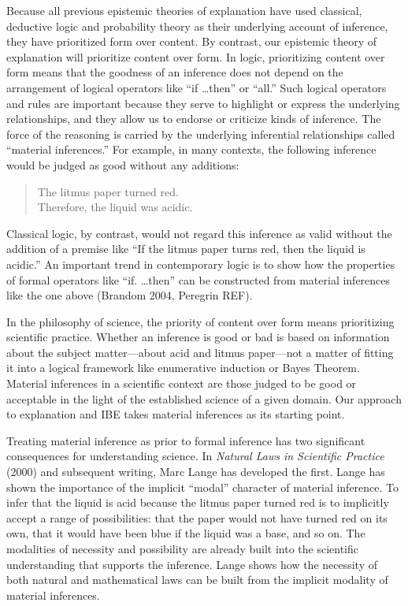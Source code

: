 \documentclass{article}[11pt]
\begin{document}
Because all previous epistemic theories of explanation  have used classical, deductive logic and probability theory as their underlying account of inference, they have prioritized form over content.  By contrast, our epistemic theory of explanation will prioritize content over form.   In logic, prioritizing content over form means that the goodness of an inference does not depend on the arrangement of logical operators like ``if \dots then'' or ``all.''  Such logical operators and  rules are important because they serve to highlight or express the underlying relationships, and they allow us to endorse or criticize kinds of inference.  The force of the reasoning is carried by the underlying inferential relationships called ``material inferences.''  For example, in many contexts, the following inference would be judged as good without any additions:

\begin{quote}
The litmus paper turned red. \\[-6pt]
Therefore, the liquid was acidic.	
\end{quote}

\noindent Classical logic, by contrast, would not regard this inference as valid without the addition of a premise like ``If the litmus paper turns red, then the liquid is acidic.''  An important trend in contemporary logic is to show how the properties of formal operators like ``if. \dots then'' can be constructed from material inferences like the one above (Brandom 2004, Peregrin REF). 

In the philosophy of science, the priority of content over form means prioritizing scientific practice.  Whether an inference is good or bad is based on information about the subject matter---about acid and litmus paper---not a matter of fitting it into a logical framework like enumerative induction or Bayes Theorem.  Material inferences in a scientific context are those judged to be good or acceptable in the light of the established science of a given domain.  Our approach to explanation and IBE takes material inferences as its starting point.

Treating material inference as prior to formal inference has two significant consequences for understanding science.  In \textit{Natural Laws in Scientific Practice} (2000) and subsequent writing, Marc Lange has developed the first.  Lange has shown the importance of the implicit ``modal'' character of material inference.  To infer that the liquid is acid because the litmus paper turned red is to implicitly accept a range of possibilities: that the paper would not have turned red on its own, that it would have been blue if the liquid was a base, and so on.  The modalities of necessity and possibility are already built into the scientific understanding that supports the inference.  Lange shows how the necessity of both natural and mathematical laws can be built from the implicit modality of material inferences. 
\end{document}
